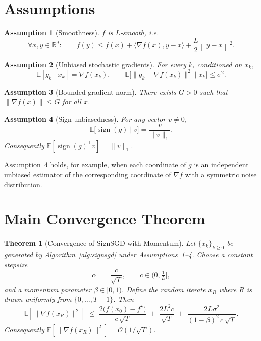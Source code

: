 \documentclass{article}
\newtheorem{theorem}{Theorem}
\newtheorem{assumption}{Assumption}
\newcommand{\E}{\mathbb{E}}
\newcommand{\R}{\mathbb{R}}
\newcommand{\norm}[1]{\left\lVert #1\right\rVert}
\newcommand{\sgn}{\operatorname{sign}}
\begin{document}
\section*{Assumptions}
\label{sec:assumptions}
\begin{assumption}[Smoothness]\label{ass:smooth}
$f$ is $L$‑smooth, i.e.
\[
\forall x,y\in\R^{d}:\qquad 
f(y)\le f(x)+\langle\nabla f(x),y-x\rangle+\frac{L}{2}\norm{y-x}^{2}.
\]
\end{assumption}
\begin{assumption}[Unbiased stochastic gradients]\label{ass:unbiased}
For every $k$, conditioned on $x_{k}$,
\[
\E[g_{k}\mid x_{k}]=\nabla f(x_{k}),\qquad 
\E\bigl[\|g_{k}-\nabla f(x_{k})\|^{2}\mid x_{k}\bigr]\le\sigma^{2}.
\]
\end{assumption}
\begin{assumption}[Bounded gradient norm]\label{ass:bounded}
There exists $G>0$ such that $\norm{\nabla f(x)}\le G$ for all $x$.
\end{assumption}
\begin{assumption}[Sign unbiasedness]\label{ass:sign}
For any vector $v\neq0$,
\[
\E\bigl[\sgn(g)\mid v\bigr]=\frac{v}{\|v\|_{1}} .
\]
Consequently $\E[\sgn(g)^{\top}v]=\|v\|_{1}$.
\end{assumption}
Assumption~\ref{ass:sign} holds, for example, when each coordinate of $g$ is an
independent unbiased estimator of the corresponding coordinate of $\nabla f$
with a symmetric noise distribution.

\section*{Main Convergence Theorem}
\begin{theorem}[Convergence of SignSGD with Momentum]\label{thm:main}
Let $\{x_{k}\}_{k\ge0}$ be generated by Algorithm~\ref{alg:signsgd}
under Assumptions~\ref{ass:smooth}--\ref{ass:sign}.
Choose a constant stepsize 
\[
\alpha \;=\; \frac{c}{\sqrt{T}},\qquad 
c\in\bigl(0,\tfrac{1}{L}\bigr],
\]
and a momentum parameter $\beta\in[0,1)$.  
Define the random iterate $x_{R}$ where $R$ is drawn uniformly from $\{0,\dots,T-1\}$.
Then
\[
\E\!\left[\|\nabla f(x_{R})\|^{2}\right]
\;\le\;
\frac{2\bigl(f(x_{0})-f^{\star}\bigr)}{c\,\sqrt{T}}
\;+\;
\frac{2L^{2}c}{\sqrt{T}}
\;+\;
\frac{2L\sigma^{2}}{(1-\beta)^{2}\,c\,\sqrt{T}} .
\tag{1}
\]
Consequently $\E[\|\nabla f(x_{R})\|^{2}]=\mathcal{O}(1/\sqrt{T})$.
\end{theorem}
\end{document}
